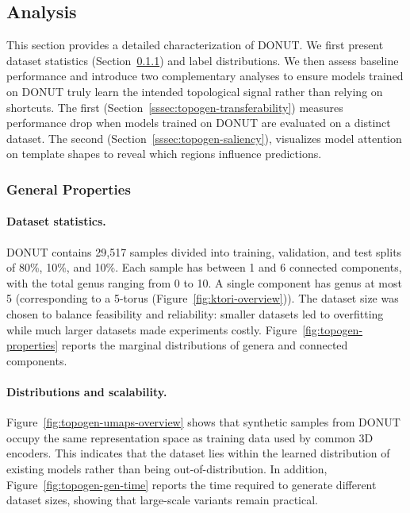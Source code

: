 \subsection{Analysis}

This section provides a detailed characterization of DONUT. We first present dataset statistics (Section~\ref{sssec:topogen-general-properties}) and label distributions. We then assess baseline performance and introduce two complementary analyses to ensure models trained on DONUT truly learn the intended topological signal rather than relying on shortcuts. The first (Section~\ref{sssec:topogen-transferability}) measures performance drop when models trained on DONUT are evaluated on a distinct dataset. The second (Section~\ref{sssec:topogen-saliency}), visualizes model attention on template shapes to reveal which regions influence predictions.

\subsubsection{General Properties}
\label{sssec:topogen-general-properties}

\paragraph{Dataset statistics.}
DONUT contains 29,517 samples divided into training, validation, and test splits of 80\%, 10\%, and 10\%. Each sample has between 1 and 6 connected components, with the total genus ranging from 0 to 10. A single component has genus at most 5 (corresponding to a 5-torus (Figure~\ref{fig:ktori-overview})). The dataset size was chosen to balance feasibility and reliability: smaller datasets led to overfitting while much larger datasets made experiments costly. Figure~\ref{fig:topogen-properties} reports the marginal distributions of genera and connected components.

\paragraph{Distributions and scalability.}
Figure~\ref{fig:topogen-umaps-overview} shows that synthetic samples from DONUT occupy the same representation space as training data used by common 3D encoders. This indicates that the dataset lies within the learned distribution of existing models rather than being out-of-distribution. In addition, Figure~\ref{fig:topogen-gen-time} reports the time required to generate different dataset sizes, showing that large-scale variants remain practical.

